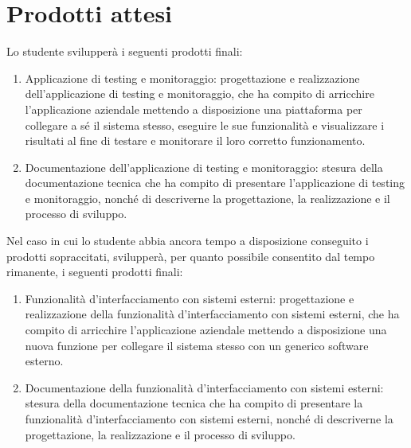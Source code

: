 \section*{Prodotti attesi}
Lo studente svilupperà i seguenti prodotti finali:
\begin{enumerate}
    \item Applicazione di testing e monitoraggio: progettazione e realizzazione dell'applicazione di testing e monitoraggio, che ha compito di arricchire l'applicazione aziendale mettendo a disposizione una piattaforma per collegare a sé il sistema stesso, eseguire le sue funzionalità e visualizzare i risultati al fine di testare e monitorare il loro corretto funzionamento. 
    
    \item Documentazione dell'applicazione di testing e monitoraggio: stesura della documentazione tecnica che ha compito di presentare l'applicazione di testing e monitoraggio, nonché di descriverne la progettazione, la realizzazione e il processo di sviluppo.
\end{enumerate}

Nel caso in cui lo studente abbia ancora tempo a disposizione conseguito i prodotti sopraccitati, svilupperà, per quanto possibile consentito dal tempo rimanente, i seguenti prodotti finali:

\begin{enumerate}
    \item Funzionalità d'interfacciamento con sistemi esterni: progettazione e realizzazione della funzionalità d'interfacciamento con sistemi esterni, che ha compito di arricchire l'applicazione aziendale mettendo a disposizione una nuova funzione per collegare il sistema stesso con un generico software esterno. 
    
    \item Documentazione della funzionalità d'interfacciamento con sistemi esterni: stesura della documentazione tecnica che ha compito di presentare la funzionalità d'interfacciamento con sistemi esterni, nonché di descriverne la progettazione, la realizzazione e il processo di sviluppo.
\end{enumerate}